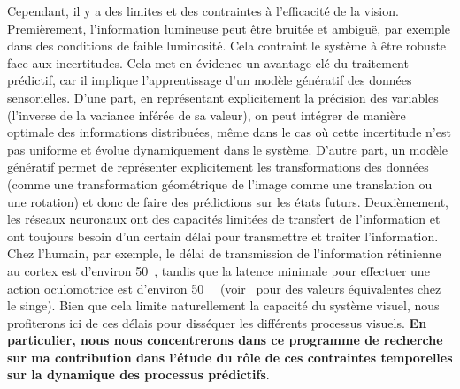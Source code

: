 Cependant, il y a des limites et des contraintes à l'efficacité de la
vision. Premièrement, l'information lumineuse peut être bruitée et
ambiguë, par exemple dans des conditions de faible luminosité. Cela
contraint le système à être robuste face aux incertitudes. Cela met en
évidence un avantage clé du traitement prédictif, car il implique
l'apprentissage d'un modèle génératif des données sensorielles. D'une
part, en représentant explicitement la précision des variables
(l'inverse de la variance inférée de sa valeur), on peut intégrer de
manière optimale des informations distribuées, même dans le cas où cette
incertitude n'est pas uniforme et évolue dynamiquement dans le système.
D'autre part, un modèle génératif permet de représenter explicitement
les transformations des données (comme une transformation géométrique de
l'image comme une translation ou une rotation) et donc de faire des
prédictions sur les états futurs. Deuxièmement, les réseaux neuronaux
ont des capacités limitées de transfert de l'information et ont toujours
besoin d'un certain délai pour transmettre et traiter l'information.
Chez l'humain, par exemple, le délai de transmission de l'information
rétinienne au cortex est d'environ 50~\ms, tandis que la latence minimale
pour effectuer une action oculomotrice est d'environ 50~\ms~\citep{Kirchner06}
 (voir~\citep{Lamme00} pour des valeurs
équivalentes chez le singe). Bien que cela limite naturellement la
capacité du système visuel, nous profiterons ici de ces délais pour
disséquer les différents processus visuels. {\bf En particulier, nous nous
concentrerons dans ce programme de recherche sur ma contribution dans l'étude
du rôle de ces contraintes
temporelles sur la dynamique des processus prédictifs}.

